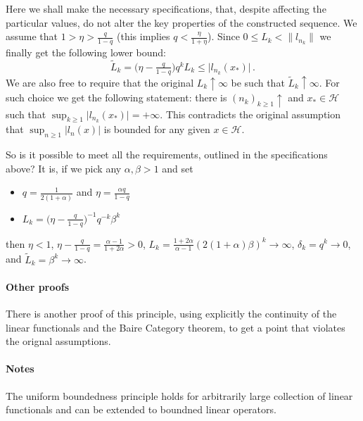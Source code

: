 \documentclass[a4paper]{article}
\newcommand{\Hcal}{\mathcal{H}}
\begin{document}
Here we shall make the necessary specifications, that, despite affecting the particular
values, do not alter the key properties of the constructed sequence. We assume that
$1 > \eta > \tfrac{q}{1-q}$ (this implies $q < \tfrac\eta{1 + \eta}$). Since $0 \leq
L_k < \|l_{n_k}\|$ we finally get the following lower bound:
\begin{equation*}
  \tilde{L}_k
    = \bigl(\eta - \tfrac{q}{1-q} \bigr) q^k L_k
    \leq \lvert l_{n_k}(x_*) \rvert
    \,.
\end{equation*}
We are also free to require that the original $L_k \uparrow \infty$ be such that
$\tilde{L}_k \uparrow \infty$. For such choice we get the following statement: there
is $(n_k)_{k\geq1} \uparrow$ and $x_* \in \Hcal$ such that $\sup_{k\geq 1} \lvert
l_{n_k}(x_*) \rvert = +\infty$. This contradicts the original assumption that
$\sup_{n\geq 1}\lvert l_n(x) \rvert$ is bounded for any given $x\in \Hcal$.

So is it possible to meet all the requirements, outlined in the specifications above?
It is, if we pick any $\alpha, \beta > 1$ and set
\begin{itemize}
  \item $q = \tfrac1{2 (1 + \alpha)}$ and $\eta = \tfrac{\alpha q}{1-q}$
  \item $L_k = \bigl(\eta - \tfrac{q}{1-q}\bigr)^{-1} q^{-k} \beta^k$
\end{itemize}
then $\eta < 1$, $\eta - \tfrac{q}{1-q} = \tfrac{\alpha - 1}{1 + 2\alpha} > 0$,
$L_k = \tfrac{1 + 2\alpha}{\alpha - 1} (2 (1 + \alpha) \beta)^k \to \infty$,
$\delta_k = q^k \to 0$, and $\tilde{L}_k = \beta^k \to \infty$.


\paragraph{Other proofs} %
\label{par:other_proofs}

There is another proof of this principle, using explicitly the continuity of the
linear functionals and the Baire Category theorem, to get a point that violates
the orignal assumptions.


\paragraph{Notes} %
\label{par:notes}

The uniform boundedness principle holds for arbitrarily large collection of linear
functionals and can be extended to boundned linear operators.


\end{document}
